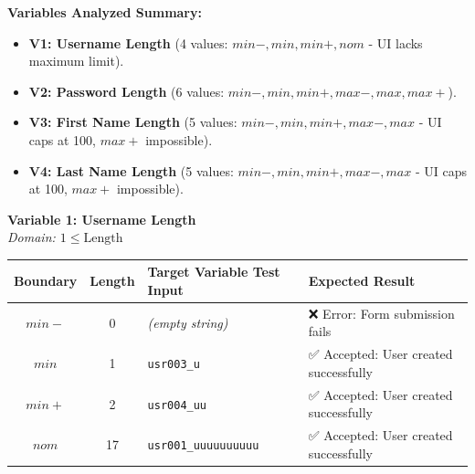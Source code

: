 \documentclass[twoside,final]{hcmut-report}
\begin{document}
\textbf{Variables Analyzed Summary:}
\begin{itemize}
    \item \textbf{V1: Username Length} (4 values: $min-, min, min+, nom$ - UI lacks maximum limit).
    \item \textbf{V2: Password Length} (6 values: $min-, min, min+, max-, max, max+$).
    \item \textbf{V3: First Name Length} (5 values: $min-, min, min+, max-, max$ - UI caps at 100, $max+$ impossible).
    \item \textbf{V4: Last Name Length} (5 values: $min-, min, min+, max-, max$ - UI caps at 100, $max+$ impossible).
\end{itemize}

\vspace{0.3cm}
\noindent\textbf{Variable 1: Username Length} \\
\textit{Domain: $1 \le \text{Length}$}
\begin{table}[H]
\centering
\renewcommand{\arraystretch}{1.2}
\begin{tabularx}{\textwidth}{|c|c|l|X|}
\hline
\textbf{Boundary} & \textbf{Length} & \textbf{Target Variable Test Input} & \textbf{Expected Result} \\ \hline
$min-$ & 0 & \textit{(empty string)} & ❌ Error: Form submission fails \\ \hline
$min$ & 1 & \texttt{usr003\_u} & ✅ Accepted: User created successfully \\ \hline
$min+$ & 2 & \texttt{usr004\_uu} & ✅ Accepted: User created successfully \\ \hline
$nom$ & 17 & \texttt{usr001\_uuuuuuuuuu} & ✅ Accepted: User created successfully \\ \hline
\end{tabularx}
\end{table}
\end{document}
